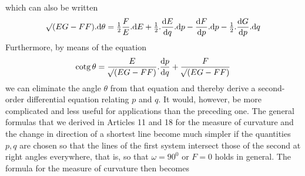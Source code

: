 which can also be written
\[
\mathord{{}^{}\!\surd}(EG-FF)\mathord{.}\mathrm{d}\theta=\tfrac{1}{2}\frac{F}{E}\mathord{.}\mathrm{d}E+\tfrac{1}{2}\mathord{.}\frac{\mathrm{d}E}{\mathrm{d}q}\mathord{.}\mathrm{d}p-\frac{\mathrm{d}F}{\mathrm{d}p}\mathord{.}\mathrm{d}p-\tfrac{1}{2}\mathord{.}\frac{\mathrm{d}G}{\mathrm{d}p}\mathord{.}\mathrm{d}q
\]
Furthermore, by means of the equation
\[
\mathrm{cotg}\,\theta=\frac{E}{\mathord{{}^{}\!\surd}(EG-FF)}\mathord{.}\frac{\mathrm{d}p}{\mathrm{d}q}+\frac{F}{\mathord{{}^{}\!\surd}(EG-FF)}
\]
we can eliminate the angle \(\theta\) from that equation and thereby derive a second-order differential equation relating \(p\) and \(q\). It would, however, be more complicated and less useful for applications than the preceding one.
The general formulas that we derived in Articles 11 and 18 for the measure of curvature and the change in direction of a shortest line become much simpler if the quantities \(p,q\) are chosen so that the lines of the first system intersect those of the second at right angles everywhere, that is, so that \(\omega=90^0\) or \(F=0\) holds in general. The formula for the measure of curvature then becomes
